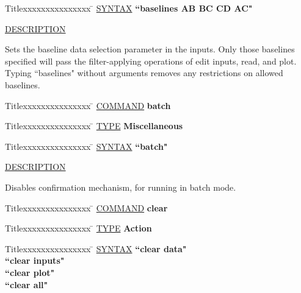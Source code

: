 \begin{tabbing}
Titlexxxxxxxxxxxxxxx \= \kill
\underline{SYNTAX} \> {\bf 		``baselines AB BC CD AC"} \\
\end{tabbing}

\underline{DESCRIPTION}
\begin{list}{}{\setlength{\leftmargin}{0.5in}
     \setlength{\rightmargin}{0in}}
\item
Sets the baseline data selection parameter in the inputs.  Only
those baselines specified will pass the filter-applying operations
of edit inputs, read, and plot.  Typing ``baselines" without
arguments removes any restrictions on allowed baselines.
\end{list}
\vspace{.2in}

\begin{tabbing}
Titlexxxxxxxxxxxxxxx \= \kill
\underline{COMMAND} \> {\bf 	batch} \\
\end{tabbing}

\begin{tabbing}
Titlexxxxxxxxxxxxxxx \= \kill
\underline{TYPE} \> {\bf 		Miscellaneous} \\
\end{tabbing}

\begin{tabbing}
Titlexxxxxxxxxxxxxxx \= \kill
\underline{SYNTAX} \> {\bf 		``batch"} \\
\end{tabbing}

\underline{DESCRIPTION}
\begin{list}{}{\setlength{\leftmargin}{0.5in}
     \setlength{\rightmargin}{0in}}
\item
Disables confirmation mechanism, for running in batch mode.
\end{list}
\vspace{.2in}

\begin{tabbing}
Titlexxxxxxxxxxxxxxx \= \kill
\underline{COMMAND} \> {\bf 	clear} \\
\end{tabbing}

\begin{tabbing}
Titlexxxxxxxxxxxxxxx \= \kill
\underline{TYPE} \> {\bf 		Action} \\
\end{tabbing}

\begin{tabbing}
Titlexxxxxxxxxxxxxxx \= \kill
\underline{SYNTAX} \> {\bf 		``clear data"} \\
\> {\bf 		``clear inputs"} \\
\> {\bf 		``clear plot"} \\
\> {\bf 		``clear all"} \\
\end{tabbing}

